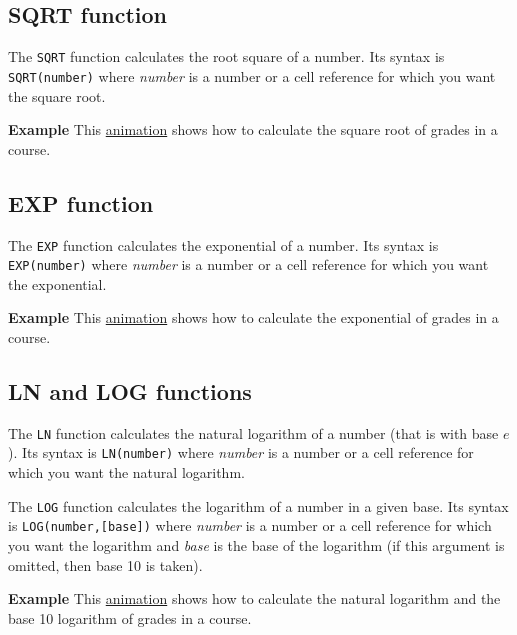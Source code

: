 \subsection{SQRT function}\hypertarget{sqrt-function}{}\label{sqrt-function}

The \texttt{SQRT} function calculates the root square of a number. Its syntax is \texttt{SQRT(number)} where \emph{number} is a number or a cell reference for which you want the square root.

\textbf{Example} This \href{http://aprendeconalf.es/office/excel/manual/img/example_function_sqrt.gif}{animation} shows how to calculate the square root of grades in a course.

\subsection{EXP function}\hypertarget{exp-function}{}\label{exp-function}

The \texttt{EXP} function calculates the exponential of a number. Its syntax is \texttt{EXP(number)} where \emph{number} is a number or a cell reference for which you want the exponential.

\textbf{Example} This \href{http://aprendeconalf.es/office/excel/manual/img/example_function_exp.gif}{animation} shows how to calculate the exponential of grades in a course.

\subsection{LN and LOG functions}\hypertarget{ln-and-log-functions}{}\label{ln-and-log-functions}

The \texttt{LN} function calculates the natural logarithm of a number (that is with base $e$). Its syntax is \texttt{LN(number)} where \emph{number} is a number or a cell reference for which you want the natural logarithm.

The \texttt{LOG} function calculates the logarithm of a number in a given base. Its syntax is \texttt{LOG(number,[base])} where \emph{number} is a number or a cell reference for which you want the logarithm and \emph{base} is the base of the logarithm (if this argument is omitted, then base 10 is taken).

\textbf{Example} This \href{http://aprendeconalf.es/office/excel/manual/img/example_function_ln.gif}{animation} shows how to calculate the natural logarithm and the base 10 logarithm of grades in a course.

